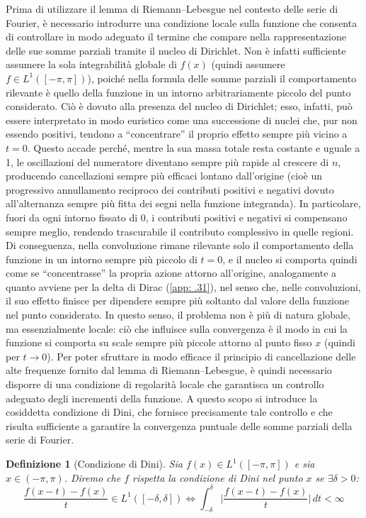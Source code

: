 \documentclass[a4paper,12pt]{report}
\newtheorem{definizione}{Definizione}[chapter]
\newcommand{\lt}{<}
\newcommand{\gt}{>}
\begin{document}
Prima di utilizzare il lemma di Riemann–Lebesgue nel contesto delle serie di Fourier, è necessario introdurre una condizione locale sulla funzione che consenta di controllare in modo adeguato il termine che compare nella rappresentazione delle sue somme parziali tramite il nucleo di Dirichlet. Non è infatti sufficiente assumere la sola integrabilità globale di $f(x)$ (quindi assumere $f\in L^1([-\pi,\pi])$), poiché nella formula delle somme parziali il comportamento rilevante è quello della funzione in un intorno arbitrariamente piccolo del punto considerato. Ciò è dovuto alla presenza del nucleo di Dirichlet; esso, infatti, può essere interpretato in modo euristico come una successione di nuclei che, pur non essendo positivi, tendono a “concentrare” il proprio effetto sempre più vicino a $t=0$. Questo accade perché, mentre la sua massa totale resta costante e uguale a 1, le oscillazioni del numeratore diventano sempre più rapide al crescere di $n$, producendo cancellazioni sempre più efficaci lontano dall’origine (cioè un progressivo annullamento reciproco dei contributi positivi e negativi dovuto all’alternanza sempre più fitta dei segni nella funzione integranda). In particolare, fuori da ogni intorno fissato di 0, i contributi positivi e negativi si compensano sempre meglio, rendendo trascurabile il contributo complessivo in quelle regioni. Di conseguenza, nella convoluzione rimane rilevante solo il comportamento della funzione in un intorno sempre più piccolo di $t=0$, e il nucleo si comporta quindi come se “concentrasse” la propria azione attorno all’origine, analogamente a quanto avviene per la delta di Dirac (\ref{app: .31}), nel senso che, nelle convoluzioni, il suo effetto finisce per dipendere sempre più soltanto dal valore della funzione nel punto considerato.
In questo senso, il problema non è più di natura globale, ma essenzialmente locale: ciò che influisce sulla convergenza è il modo in cui la funzione si comporta su scale sempre più piccole attorno al punto fisso $x$ (quindi per $t\to 0$). Per poter sfruttare in modo efficace il principio di cancellazione delle alte frequenze fornito dal lemma di Riemann–Lebesgue, è quindi necessario disporre di una condizione di regolarità locale che garantisca un controllo adeguato degli incrementi della funzione.
A questo scopo si introduce la cosiddetta condizione di Dini, che fornisce precisamente tale controllo e che risulta sufficiente a garantire la convergenza puntuale delle somme parziali della serie di Fourier.

\begin{definizione}[Condizione di Dini]
    Sia $f(x)\in L^1([-\pi,\pi])$ e sia $x\in (-\pi,\pi)$. Diremo che $f$ rispetta la condizione di Dini nel punto $x$ se $\exists \delta \gt 0$:
    \[\displaystyle\frac{f(x-t)-f(x)}{t}\in L^1([-\delta,\delta])\iff\int_{-\delta}^\delta\bigg|\frac{f(x-t)-f(x)}{t}\bigg|\,dt\lt\infty\]
\end{definizione}
\end{document}
